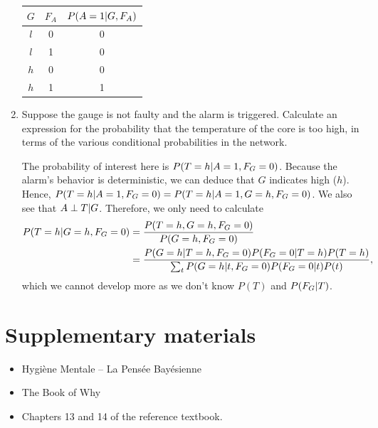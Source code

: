 \documentclass[11pt, a4paper]{article}
\begin{document}
\begin{enumerate}
    \begin{solution}
        \begin{table}[h]
            \centering
            \begin{tabular}{cc|c}
                \toprule
                 $G$ & $F_A$ & $P(A = 1 \vert G, F_A)$ \\
                 \midrule
                 $l$ & 0 & 0 \\
                 $l$ & 1 & 0 \\
                 $h$ & 0 & 0 \\
                 $h$ & 1 & 1 \\
                 \bottomrule
            \end{tabular}
        \end{table}
    \end{solution}

    \item Suppose the gauge is not faulty and the alarm is triggered. Calculate an expression for the probability that the temperature of the core is too high, in terms of the various conditional probabilities in the network.

    \begin{solution}
        The probability of interest here is $P(T = h \vert A = 1, F_G = 0)$. Because the alarm's behavior is deterministic, we can deduce that $G$ indicates high ($h$). Hence, $P(T = h \vert A = 1, F_G = 0) = P(T = h \vert A = 1, G = h, F_G = 0)$. We also see that $A \perp T \vert G$. Therefore, we only need to calculate
        \begin{align*}
            P(T = h \vert G = h, F_G = 0) & = \frac{P(T = h, G = h, F_G = 0)}{P(G = h, F_G = 0)} \\
            & = \frac{P(G = h \vert T = h, F_G = 0) P(F_G = 0 \vert T = h) P(T = h)}{\sum_t P(G = h \vert t, F_G = 0) P(F_G = 0 \vert t) P(t)} ,
        \end{align*}
        which we cannot develop more as we don't know $P(T)$ and $P(F_G \vert T)$.
    \end{solution}
\end{enumerate}

\newpage

\section*{Supplementary materials}

\begin{itemize}
    \item Hygiène Mentale -- La Pensée Bayésienne


    \item The Book of Why


    \item Chapters 13 and 14 of the reference textbook.
\end{itemize}
\end{document}
